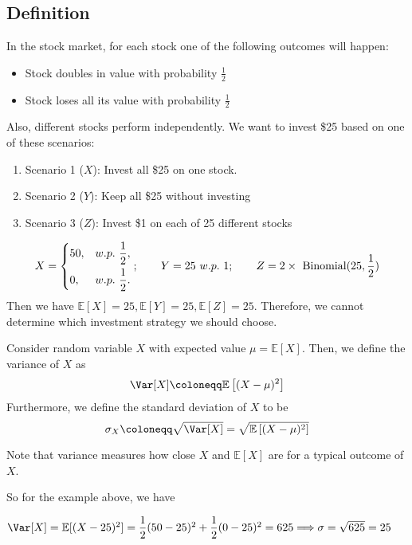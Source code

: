 \subsection{Definition}
In the stock market, for each stock one of the following outcomes will happen:
\begin{itemize}
    \item Stock doubles in value with probability \(\frac{1}{2}\) 
    \item Stock loses all its value with probability \(\frac{1}{2}\) 
\end{itemize}
Also, different stocks perform independently. We want to invest \$25 based on one of these scenarios:
\begin{enumerate}
    \item Scenario 1 (\(X\)): Invest all \$25 on one stock. 
    \item Scenario 2 (\(Y\)): Keep all \$25 without investing
    \item Scenario 3 (\(Z\)): Invest \$1 on each of 25 different stocks
\end{enumerate}
\[
    X = \begin{dcases}
        50, & w.p.\ \frac{1}{2}  ,\\
        0, & w.p.\ \frac{1}{2}  .
    \end{dcases};
    \quad\quad 
    Y = 25\ w.p.\ 1;
    \quad\quad 
    Z = 2 \times \ \text{Binomial}(25, \frac{1}{2})
\]
Then we have \(\mathbb{E}[X] = 25, \mathbb{E}[Y] = 25, \mathbb{E}[Z] = 25 \). Therefore, we cannot determine which investment strategy we should choose. 

\begin{definition}
    Consider random variable \(X\) with expected value \(\mu = \mathbb{E}[X]\). Then, we define the variance of \(X\) as
    \[
        \Var[X] \coloneqq \mathbb{E}\left[(X - \mu)^2 \right] 
    \]
    Furthermore, we define the standard deviation of \(X\) to be
    \[
        \sigma_X \coloneqq \sqrt{\Var[X]} =  \sqrt{\mathbb{E}\left[(X - \mu)^2 \right]} 
    \]
\end{definition} 

Note that variance measures how close \(X\) and \(\mathbb{E}[X]\) are for a typical outcome of \(X\).

So for the example above, we have 

\(\Var[X] = \mathbb{E}[(X - 25)^2] = \dfrac{1}{2}(50 - 25)^2 + \dfrac{1}{2} (0 - 25)^2 = 625 \Longrightarrow \sigma = \sqrt{625} = 25\) 

